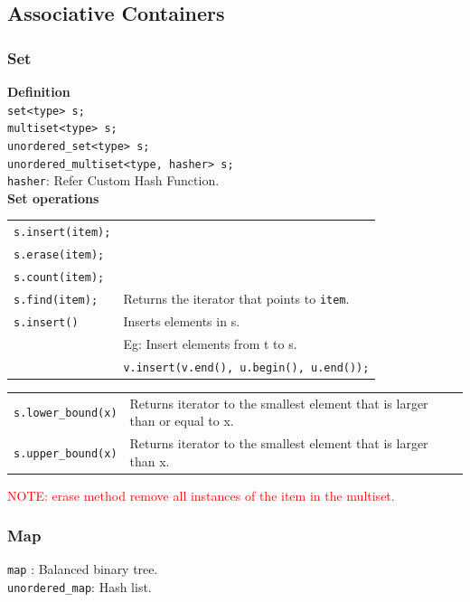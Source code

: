 \subsection{Associative Containers}

\subsubsection{Set}
\textbf{Definition}\\
\texttt{set<type> s;}\\
\texttt{multiset<type> s;}\\
\texttt{unordered\_set<type> s;}\\
\texttt{unordered\_multiset<type, hasher> s;}\\
\texttt{hasher}: Refer Custom Hash Function.\\


\textbf{Set operations}\\
\begin{tabularx}{\linewidth}{lX}
\texttt{s.insert(item);} & \\
\texttt{s.erase(item);} & \\
\texttt{s.count(item);} & \\
\texttt{s.find(item);} & Returns the iterator that points to \texttt{item}.\\
\texttt{s.insert()} & Inserts elements in s.\\
& Eg: Insert elements from t to s.\\
& \texttt{v.insert(v.end(), u.begin(), u.end());}\\
\end{tabularx}

\begin{tabularx}{\linewidth}{lX}
\texttt{s.lower\_bound(x)} & Returns iterator to the smallest element that is larger than or equal to x.\\
\texttt{s.upper\_bound(x)} & Returns iterator to the smallest element that is larger than x.\\
\end{tabularx}

\textcolor{red}{NOTE: erase method remove all instances of the item in the multiset.}

\subsubsection{Map}

\texttt{map} : Balanced binary tree.\\
\texttt{unordered\_map}: Hash list.\\

